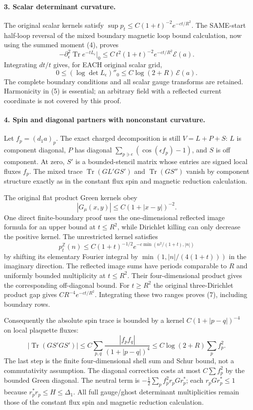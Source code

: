 \documentclass[11pt]{article}
\begin{document}
\paragraph{3. Scalar determinant curvature.}
The original scalar kernels satisfy
$\sup p_t\le C(1+t)^{-2}e^{-ct/R^2}$.
The SAME-start half-loop reversal of the mixed boundary magnetic loop bound calculation, now using the summed
moment (4), proves
\[
 -\partial_\epsilon^2\operatorname{Tr}e^{-tL_\epsilon}\big|_0
 \le C\,t^2(1+t)^{-2}e^{-ct/R^2}\mathcal E(a).
\]
Integrating $dt/t$ gives, for EACH original scalar grid,
\[
 0\le(\log\det L_\epsilon)''_0
                  \le C\log(2+R)\,\mathcal E(a).                \tag{6}
\]
The complete boundary conditions and all scalar gauge transforms
are retained. Harmonicity in (5) is essential; an arbitrary field
with a reflected current coordinate is not covered by this proof.

\paragraph{4. Spin and diagonal partners with nonconstant curvature.}
Let $f_p=(d_1a)_p$. The exact charged decomposition is still
$V=L+P+S$: $L$ is component diagonal, $P$ has diagonal
$\sum_{p\ni e}(\cos(\epsilon f_p)-1)$, and $S$ is off component.
At zero, $S'$ is a bounded-stencil matrix whose entries are signed
local fluxes $f_p$. The mixed trace
$\operatorname{Tr}(GL'GS')$ and $\operatorname{Tr}(GS'')$ vanish
by component structure exactly as in the constant flux spin and magnetic reduction calculation.

The original flat product Green kernels obey
\[
 |G_\mu(x,y)|\le C(1+|x-y|)^{-2}.                               \tag{7}
\]
One direct finite-boundary proof uses the one-dimensional reflected
image formula for an upper bound at $t\le R^2$, while Dirichlet killing
can only decrease the positive kernel. The unrestricted kernel satisfies
\[
 p_t^{\mathbb Z}(n)\le C(1+t)^{-1/2}
  e^{-c\min(n^2/(1+t),|n|)}
\]
by shifting its elementary Fourier integral by
$\min(1,|n|/(4(1+t)))$ in the imaginary direction.
The reflected image sums have periods comparable to $R$ and uniformly
bounded multiplicity at $t\le R^2$. Their four-dimensional product gives
the corresponding off-diagonal bound. For $t\ge R^2$ the original
three-Dirichlet product gap gives $CR^{-4}e^{-ct/R^2}$.
Integrating these two ranges proves (7), including boundary rows.

Consequently the absolute spin trace is bounded by a kernel
$C(1+|p-q|)^{-4}$ on local plaquette fluxes:
\[
 |\operatorname{Tr}(GS'GS')|
 \le C\sum_{p,q}\frac{|f_p f_q|}{(1+|p-q|)^4}
 \le C\log(2+R)\sum_p f_p^2.                                   \tag{8}
\]
The last step is the finite four-dimensional shell sum and Schur
bound, not a commutativity assumption.
The diagonal correction costs at most $C\sum f_p^2$ by the bounded
Green diagonal. The neutral term is
$-\frac12\sum_p f_p^2 r_p G r_p^*$; each $r_p G r_p^*\le1$
because $r_p^*r_p\le H\le\Delta_1$.
All full gauge/ghost determinant multiplicities remain those of the constant flux spin and magnetic reduction calculation.
\end{document}
